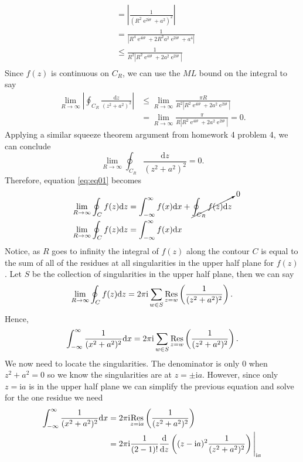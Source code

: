 \documentclass[10pt]{amsart}
\newcommand{\D}{\mathrm{d}}
\newcommand{\I}{\mathrm{i}}
\DeclareMathOperator{\E}{e}
\theoremstyle{nonumberplain}
\begin{document}
\begin{enumerate}[label={\bf {\arabic*}:}]
\begin{align*}
	&= \left| \frac 1 {(R^2\E^{2\I\theta} + a^2)^2} \right| \\
	&= \frac 1 {\left|R^4\E^{4\I\theta} + 2R^2a^2\E^{2\I\theta} + a^4 \right|} \\
	&\leq \frac 1 {R^2\left|R^2\E^{4\I\theta} + 2a^2\E^{2\I\theta} \right|} \\
\end{align*}
Since $f(z)$ is continuous on $C_R$, we can use the $ML$ bound on the integral to say
\begin{align*}
\lim_{R\rightarrow\infty}\left| \oint_{C_R} \frac {\D z}{ (z^2 + a^2)^2 } \right|
	&\leq \lim_{R\rightarrow\infty} \frac {\pi R} {R^2\left|R^2\E^{4\I\theta} + 2a^2\E^{2\I\theta} \right|} \\
	&= \lim_{R\rightarrow\infty} \frac {\pi} {R\left|R^2\E^{4\I\theta} + 2a^2\E^{2\I\theta} \right|} = 0.
\end{align*}
Applying a similar squeeze theorem argument from homework 4 problem 4, we can conclude
$$
\lim_{R\rightarrow\infty} \oint_{C_R} \frac {\D z}{ (z^2 + a^2)^2 } = 0.
$$
Therefore, equation \eqref{eq:eq01} becomes
\begin{align*}
\lim_{R\rightarrow\infty} \oint_C f(z) \D z &= \int_{-\infty}^\infty f(x) \D x + \cancelto{0}{\oint_{C_R} f(z) \D z} \\
\lim_{R\rightarrow\infty} \oint_C f(z) \D z &= \int_{-\infty}^\infty f(x) \D x
\end{align*}
Notice, as $R$ goes to infinity the integral of $f(z)$ along the contour $C$ is equal to the sum of all of the residues at all singularities in the upper half plane for $f(z)$.
Let $S$ be the collection of singularities in the upper half plane, then we can say
$$
\lim_{R\rightarrow\infty} \oint_C f(z) \D z
	= 2\pi \I \sum_{w \in S} \underset{z=w}{\rm Res} \left( \frac 1 { (z^2 + a^2)^2 } \right). 
$$
Hence,
$$
\int_{-\infty}^\infty \frac 1 {(x^2 + a^2)^2} \D x
	= 2\pi \I \sum_{w \in S} \underset{z=w}{\rm Res} \left( \frac 1 { (z^2 + a^2)^2 } \right).
$$
We now need to locate the singularities.
The denominator is only 0 when $z^2 + a^2 = 0$ so we know the singularities are at $z = \pm \I a$.
However, since only $z = \I a$ is in the upper half plane we can simplify the previous equation and solve for the one residue we need
\begin{align*}
\int_{-\infty}^\infty \frac 1 {(x^2 + a^2)^2} \D x
	&= 2\pi \I \underset{z=\I a}{\rm Res} \left( \frac 1 { (z^2 + a^2)^2 } \right) \\
	&= 2\pi \I \frac 1 {(2 - 1)!}\frac {\D}{\D z} \left((z - \I a)^2\frac 1 {(z^2 + a^2)^2} \right)\Bigg|_{\I a} \\

\end{align*}
\end{enumerate}
\end{document}
